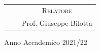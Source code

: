 \begin{titlepage}
\bigskip


\bigskip

\bigskip


\bigskip


\bigskip


\bigskip
\begin{center}
	\begin{tabular}[t]{ccc}
		\textsc{} & \hspace{8cm} &\textsc{Relatore}\\
		& \hspace{8cm} & Prof. Giuseppe Bilotta\\
	\end{tabular}
\end{center}


\bigskip


\bigskip


\bigskip


\bigskip


\bigskip


\bigskip


\bigskip

\bigskip


\bigskip

{\centering\large
Anno Accademico 2021/22
\par}
\end{titlepage}
